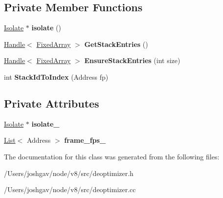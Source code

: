 \subsection*{Private Member Functions}
\begin{DoxyCompactItemize}
\item 
\hyperlink{classv8_1_1internal_1_1_isolate}{Isolate} $\ast$ {\bfseries isolate} ()\hypertarget{classv8_1_1internal_1_1_materialized_object_store_a5bc2b4163d1d63bbd38969e348341254}{}\label{classv8_1_1internal_1_1_materialized_object_store_a5bc2b4163d1d63bbd38969e348341254}

\item 
\hyperlink{classv8_1_1internal_1_1_handle}{Handle}$<$ \hyperlink{classv8_1_1internal_1_1_fixed_array}{Fixed\+Array} $>$ {\bfseries Get\+Stack\+Entries} ()\hypertarget{classv8_1_1internal_1_1_materialized_object_store_ab0e78cd2b624f4eaf06aeaec0f6bed5c}{}\label{classv8_1_1internal_1_1_materialized_object_store_ab0e78cd2b624f4eaf06aeaec0f6bed5c}

\item 
\hyperlink{classv8_1_1internal_1_1_handle}{Handle}$<$ \hyperlink{classv8_1_1internal_1_1_fixed_array}{Fixed\+Array} $>$ {\bfseries Ensure\+Stack\+Entries} (int size)\hypertarget{classv8_1_1internal_1_1_materialized_object_store_a929d3b0b9c06bd4c2a5a72d271dc2fd2}{}\label{classv8_1_1internal_1_1_materialized_object_store_a929d3b0b9c06bd4c2a5a72d271dc2fd2}

\item 
int {\bfseries Stack\+Id\+To\+Index} (Address fp)\hypertarget{classv8_1_1internal_1_1_materialized_object_store_af34184266190710fae87c6290ddeb054}{}\label{classv8_1_1internal_1_1_materialized_object_store_af34184266190710fae87c6290ddeb054}

\end{DoxyCompactItemize}
\subsection*{Private Attributes}
\begin{DoxyCompactItemize}
\item 
\hyperlink{classv8_1_1internal_1_1_isolate}{Isolate} $\ast$ {\bfseries isolate\+\_\+}\hypertarget{classv8_1_1internal_1_1_materialized_object_store_ae33e3d2e34d0285089ed1cdce09d05ab}{}\label{classv8_1_1internal_1_1_materialized_object_store_ae33e3d2e34d0285089ed1cdce09d05ab}

\item 
\hyperlink{classv8_1_1internal_1_1_list}{List}$<$ Address $>$ {\bfseries frame\+\_\+fps\+\_\+}\hypertarget{classv8_1_1internal_1_1_materialized_object_store_acc51a29b429da2a7db1e31e64cf0854b}{}\label{classv8_1_1internal_1_1_materialized_object_store_acc51a29b429da2a7db1e31e64cf0854b}

\end{DoxyCompactItemize}


The documentation for this class was generated from the following files\+:\begin{DoxyCompactItemize}
\item 
/\+Users/joshgav/node/v8/src/deoptimizer.\+h\item 
/\+Users/joshgav/node/v8/src/deoptimizer.\+cc\end{DoxyCompactItemize}
